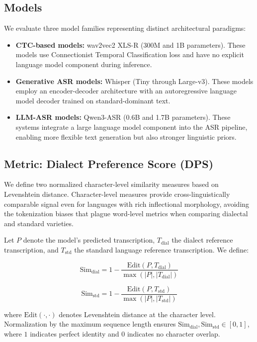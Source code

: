 \documentclass[11pt]{article}
\begin{document}
\subsection{Models}

We evaluate three model families representing distinct architectural paradigms:

\begin{itemize}
\item \textbf{CTC-based models:} wav2vec2 XLS-R (300M and 1B parameters). These models use Connectionist Temporal Classification loss and have no explicit language model component during inference.
\item \textbf{Generative ASR models:} Whisper (Tiny through Large-v3). These models employ an encoder-decoder architecture with an autoregressive language model decoder trained on standard-dominant text.
\item \textbf{LLM-ASR models:} Qwen3-ASR (0.6B and 1.7B parameters). These systems integrate a large language model component into the ASR pipeline, enabling more flexible text generation but also stronger linguistic priors.
\end{itemize}

\subsection{Metric: Dialect Preference Score (DPS)}

We define two normalized character-level similarity measures based on Levenshtein distance. Character-level measures provide cross-linguistically comparable signal even for languages with rich inflectional morphology, avoiding the tokenization biases that plague word-level metrics when comparing dialectal and standard varieties.

Let $P$ denote the model's predicted transcription, $T_{\text{dial}}$ the dialect reference transcription, and $T_{\text{std}}$ the standard language reference transcription. We define:

\begin{equation}
\text{Sim}_{\text{dial}} = 1 - \frac{\text{Edit}(P, T_{\text{dial}})}{\max(|P|, |T_{\text{dial}}|)}
\end{equation}

\begin{equation}
\text{Sim}_{\text{std}} = 1 - \frac{\text{Edit}(P, T_{\text{std}})}{\max(|P|, |T_{\text{std}}|)}
\end{equation}

where $\text{Edit}(\cdot, \cdot)$ denotes Levenshtein distance at the character level. Normalization by the maximum sequence length ensures $\text{Sim}_{\text{dial}}, \text{Sim}_{\text{std}} \in [0, 1]$, where $1$ indicates perfect identity and $0$ indicates no character overlap.
\end{document}

